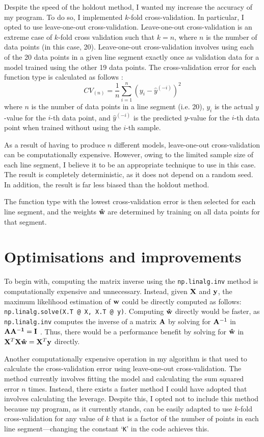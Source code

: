 \documentclass[onecolumn, 12pt, a4paper]{article}
\begin{document}
Despite the speed of the holdout method, I wanted my increase the accuracy
of my program.
To do so, I implemented $k$-fold cross-validation.
In particular, I opted to use leave-one-out cross-validation.
Leave-one-out cross-validation is 
an extreme case of $k$-fold cross validation
such that $k = n$, where
$n$ is the number of data points (in this case, 20).
Leave-one-out cross-validation involves using each of
the 20 data points in a given line segment exactly once as validation data for a model
trained using the other 19 data points. 
The cross-validation error for each function type is calculated
as follows \cite{Stanford}:
\[
    CV_{(n)} = \frac{1}{n} \sum_{i = 1}^{n} (y_{i} - \hat{y}^{(-i)})^{2}
\]
where
$n$ is the number of data points in a line segment (i.e. 20),
$y_{i}$ is the actual $y$-value for the $i$-th data point,
and $\hat{y}^{(-i)}$ is the predicted $y$-value for the $i$-th
data point when trained without using the $i$-th sample.

As a result of having to produce $n$ different models,
leave-one-out cross-validation can be computationally expensive.
However, owing to the limited sample size of each line segment,
I believe it to be an appropriate technique to use in this case.
The result is completely deterministic, as it does not depend
on a random seed.
In addition, the result is far less biased than the holdout method.

The function type with the lowest cross-validation error
is then selected for each line segment,
and the weights $\vb{\hat{w}}$ are determined by training on all
data points for that segment.

\section{Optimisations and improvements}

To begin with,
computing the matrix inverse using the \texttt{np.linalg.inv}
method is computationally expensive and unnecessary.
Instead, given $\vb{X}$ and $\vb{y}$, the maximum likelihood
estimation of $\vb{w}$ could be directly computed as follows:
\texttt{np.linalg.solve(X.T @ X, X.T @ y)}.
Computing $\vb{\hat{w}}$ directly would be faster, as \texttt{np.linalg.inv}
computes the inverse of a matrix $\vb{A}$ by solving for $\vb{A}^{-1}$
in $\vb{AA^{-1} = I}$ \cite{StackOverflow}.
Thus, there would be a performance benefit by solving for
$\vb{\hat{w}}$ in
$\vb{X}^{T} \vb{X} \vb{\hat{w}} = \vb{X}^{T} \vb{y}$ directly.

Another computationally expensive operation in my
algorithm is that used to calculate the cross-validation error 
using leave-one-out cross-validation.
The method currently involves
fitting the model and calculating the sum squared error
$n$ times. 
Instead, there exists a faster method I could have
adopted that involves calculating the leverage.
Despite this, I opted not to include this method 
because my program, as it currently stands, can be 
easily adapted to use $k$-fold cross-validation for 
any value of $k$ that is a factor of the number of points in each line segment---changing
the constant `\texttt{K}' in the code achieves this.
\end{document}
